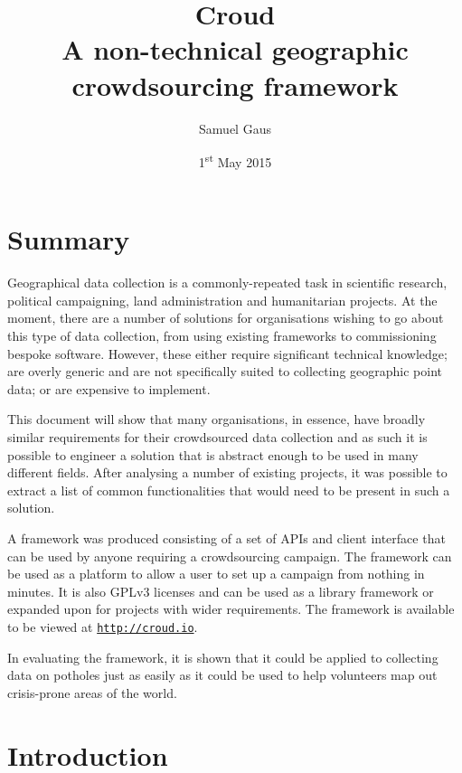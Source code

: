 \documentclass{article}
\let\oldsection\section
\renewcommand\section{\clearpage\oldsection}
\begin{document}
	\title{Croud \\ \vspace{2 mm} {\large A non-technical geographic crowdsourcing framework}}
	\author{Samuel Gaus}
	\date{1\textsuperscript{st} May 2015}
	\maketitle

	\tableofcontents

	\section{Summary}
	\label{sec:summary}
		Geographical data collection is a commonly-repeated task in scientific research, political campaigning, land administration and humanitarian projects. At the moment, there are a number of solutions for organisations wishing to go about this type of data collection, from using existing frameworks to commissioning bespoke software. However, these either require significant technical knowledge; are overly generic and are not specifically suited to collecting geographic point data; or are expensive to implement.

		This document will show that many organisations, in essence, have broadly similar requirements for their crowdsourced data collection and as such it is possible to engineer a solution that is abstract enough to be used in many different fields. After analysing a number of existing projects, it was possible to extract a list of common functionalities that would need to be present in such a solution.

		A framework was produced consisting of a set of APIs and client interface that can be used by anyone requiring a crowdsourcing campaign. The framework can be used as a platform to allow a user to set up a campaign from nothing in minutes. It is also GPLv3 licenses and can be used as a library framework or expanded upon for projects with wider requirements. The framework is available to be viewed at \href{http://croud.io}{\nolinkurl{http://croud.io}}.

		In evaluating the framework, it is shown that it could be applied to collecting data on potholes just as easily as it could be used to help volunteers map out crisis-prone areas of the world.

	\section{Introduction}
	\label{sec:introduction}
\end{document}
